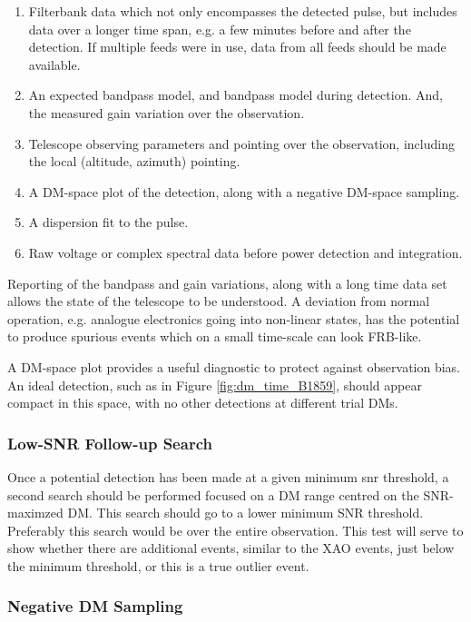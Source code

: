 \documentclass[a4paper,fleqn,usenatbib]{mnras}
\begin{document}
\begin{enumerate}
    \item Filterbank data which not only encompasses the detected pulse, but
    includes data over a longer time span, e.g. a few minutes before and after
    the detection. If multiple feeds were in use, data from all feeds should be
    made available.
    \item An expected bandpass model, and bandpass model during detection. And,
    the measured gain variation over the observation.
    \item Telescope observing parameters and pointing over the observation,
    including the local (altitude, azimuth) pointing.
    \item A DM-space plot of the detection, along with a negative DM-space
    sampling.
    \item A dispersion fit to the pulse.
    \item Raw voltage or complex spectral data before power detection and
    integration.
\end{enumerate}

Reporting of the bandpass and gain variations, along with a long time data set
allows the state of the telescope to be understood. A deviation from normal
operation, e.g. analogue electronics going into non-linear states, has the
potential to produce spurious events which on a small time-scale can look
FRB-like.

A DM-space plot provides a useful diagnostic to protect against observation
bias. An ideal detection, such as in Figure \ref{fig:dm_time_B1859}, should
appear compact in this space, with no other detections at different trial DMs.

\subsubsection{Low-SNR Follow-up Search}

Once a potential detection has been made at a given minimum \gls{snr} threshold,
a second search should be performed focused on a DM range centred on the
SNR-maximzed DM. This search should go to a lower minimum SNR threshold.
Preferably this search would be over the entire observation. This test will
serve to show whether there are additional events, similar to the XAO events,
just below the minimum threshold, or this is a true outlier event.

\subsubsection{Negative DM Sampling}
\end{document}
